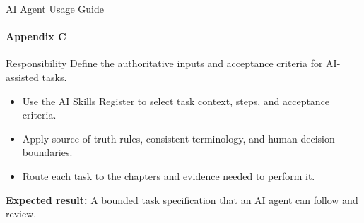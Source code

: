 \begin{frame}{AI Agent Usage Guide}
\framesubtitle{Appendix C}
\begin{block}{Responsibility}
Define the authoritative inputs and acceptance criteria for AI-assisted tasks.
\end{block}
\begin{itemize}
  \item Use the AI Skills Register to select task context, steps, and acceptance criteria.
  \item Apply source-of-truth rules, consistent terminology, and human decision boundaries.
  \item Route each task to the chapters and evidence needed to perform it.
\end{itemize}
\vspace{0.15cm}
\textbf{Expected result:} A bounded task specification that an AI agent can follow and review.
\end{frame}
